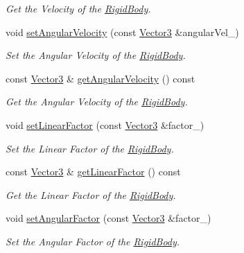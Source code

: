 \begin{DoxyCompactItemize}
\begin{DoxyCompactList}\small\item\em Get the Velocity of the \hyperlink{class_i_dream_sky_1_1_physics3_1_1_rigid_body}{Rigid\+Body}. \end{DoxyCompactList}\item 
void \hyperlink{class_i_dream_sky_1_1_physics3_1_1_vehicle_ab85d6317bb9f28d932246d25fa3dc199}{set\+Angular\+Velocity} (const \hyperlink{class_i_dream_sky_1_1_vector3}{Vector3} \&angular\+Vel\+\_\+)
\begin{DoxyCompactList}\small\item\em Set the Angular Velocity of the \hyperlink{class_i_dream_sky_1_1_physics3_1_1_rigid_body}{Rigid\+Body}. \end{DoxyCompactList}\item 
const \hyperlink{class_i_dream_sky_1_1_vector3}{Vector3} \& \hyperlink{class_i_dream_sky_1_1_physics3_1_1_vehicle_a23981e22d6d9e5bc15a094241c23f511}{get\+Angular\+Velocity} () const 
\begin{DoxyCompactList}\small\item\em Get the Angular Velocity of the \hyperlink{class_i_dream_sky_1_1_physics3_1_1_rigid_body}{Rigid\+Body}. \end{DoxyCompactList}\item 
void \hyperlink{class_i_dream_sky_1_1_physics3_1_1_vehicle_a754c837023ddbcc513c8cbd1acc7d79a}{set\+Linear\+Factor} (const \hyperlink{class_i_dream_sky_1_1_vector3}{Vector3} \&factor\+\_\+)
\begin{DoxyCompactList}\small\item\em Set the Linear Factor of the \hyperlink{class_i_dream_sky_1_1_physics3_1_1_rigid_body}{Rigid\+Body}. \end{DoxyCompactList}\item 
const \hyperlink{class_i_dream_sky_1_1_vector3}{Vector3} \& \hyperlink{class_i_dream_sky_1_1_physics3_1_1_vehicle_a5086c010609a50950c4f7f3247ad2d7b}{get\+Linear\+Factor} () const 
\begin{DoxyCompactList}\small\item\em Get the Linear Factor of the \hyperlink{class_i_dream_sky_1_1_physics3_1_1_rigid_body}{Rigid\+Body}. \end{DoxyCompactList}\item 
void \hyperlink{class_i_dream_sky_1_1_physics3_1_1_vehicle_a5a42145d7476ff9880e9d1037b92a16f}{set\+Angular\+Factor} (const \hyperlink{class_i_dream_sky_1_1_vector3}{Vector3} \&factor\+\_\+)
\begin{DoxyCompactList}\small\item\em Set the Angular Factor of the \hyperlink{class_i_dream_sky_1_1_physics3_1_1_rigid_body}{Rigid\+Body}. \end{DoxyCompactList}\item 

\end{DoxyCompactItemize}
